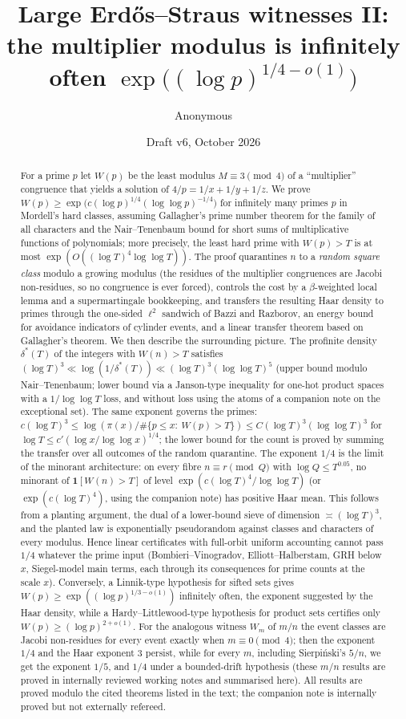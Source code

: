 \documentclass[11pt,reqno]{amsart}
\title[A sub-exponential Erd\H{o}s--Straus witness bound]{Large Erd\H{o}s--Straus witnesses II:\\
the multiplier modulus is infinitely often $\exp\big((\log p)^{1/4-o(1)}\big)$}
\author{Anonymous}
\date{Draft v6, October 2026}
\theoremstyle{definition}
\begin{document}
\begin{abstract}
For a prime $p$ let $W(p)$ be the least modulus $M\equiv3\pmod4$ of a
``multiplier'' congruence that yields a solution of $4/p=1/x+1/y+1/z$.  We
prove $W(p)\ge\exp\big(c(\log p)^{1/4}(\log\log p)^{-1/4}\big)$ for infinitely
many primes $p$ in Mordell's hard classes, assuming Gallagher's prime number
theorem for the family of all characters and the Nair--Tenenbaum bound for
short sums of multiplicative functions of polynomials; more precisely, the
least hard prime with $W(p)>T$ is at most $\exp(O((\log T)^4\log\log T))$.
The proof quarantines $n$ to a \emph{random square class} modulo a growing
modulus (the residues of the multiplier congruences are Jacobi
non-residues, so no congruence is ever forced), controls the cost by a
$\beta$-weighted local lemma and a supermartingale bookkeeping, and transfers
the resulting Haar density to primes through the one-sided $\ell^2$ sandwich
of Bazzi and Razborov, an energy bound for avoidance indicators of cylinder
events, and a linear transfer theorem based on Gallagher's theorem.
We then describe the surrounding picture.  The profinite density
$\delta^*(T)$ of the integers with $W(n)>T$ satisfies
$(\log T)^3\ll\log(1/\delta^*(T))\ll(\log T)^3(\log\log T)^5$ (upper bound modulo
Nair--Tenenbaum; lower bound via a Janson-type inequality for one-hot
product spaces with a $1/\log\log T$ loss, and without loss using the atoms
of a companion note on the exceptional set).  The same exponent governs
the primes: $c(\log T)^3\le\log(\pi(x)/\#\{p\le x:\ W(p)>T\})\le C(\log T)^3(\log\log T)^3$
for $\log T\le c'(\log x/\log\log x)^{1/4}$; the lower bound for the count is proved
by summing the transfer over all outcomes of the random quarantine.  The
exponent $1/4$ is the limit of the minorant architecture: on every fibre
$n\equiv r\pmod Q$ with $\log Q\le T^{0.05}$, no minorant of $\mathbf 1[W(n)>T]$ of level
$\exp(c(\log T)^4/\log\log T)$ (or $\exp(c(\log T)^4)$, using the companion note) has
positive Haar mean.  This follows from a planting argument, the dual of a
lower-bound sieve of dimension $\asymp(\log T)^3$, and the planted law is
exponentially pseudorandom against classes and characters of every
modulus.  Hence linear certificates with full-orbit uniform accounting
cannot pass $1/4$ whatever the prime input (Bombieri--Vinogradov,
Elliott--Halberstam, GRH below $x$, Siegel-model main terms, each through its
consequences for prime counts at the scale $x$).  Conversely, a
Linnik-type hypothesis for sifted sets gives
$W(p)\ge\exp((\log p)^{1/3-o(1)})$ infinitely often, the exponent suggested by the
Haar density, while a Hardy--Littlewood-type hypothesis for product sets
certifies only $W(p)\ge(\log p)^{2+o(1)}$.  For the analogous witness $W_m$ of
$m/n$ the event classes are Jacobi non-residues for every event exactly
when $m\equiv0\pmod4$; then the exponent $1/4$ and the Haar exponent $3$
persist, while for every $m$, including Sierpi\'nski's $5/n$, we get the
exponent $1/5$, and $1/4$ under a bounded-drift hypothesis (these $m/n$
results are proved in internally reviewed working notes and summarised
here).  All results are proved modulo the cited theorems listed in the text;
the companion note is internally proved but not externally refereed.
\end{abstract}
\end{document}
